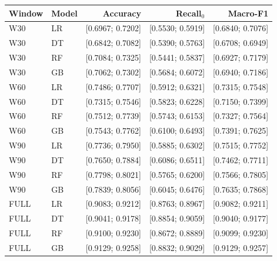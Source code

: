 \small
\setlength{\tabcolsep}{4pt}
\begin{tabular}{@{}llrrr@{}}
\toprule
Window & Model & Accuracy & Recall$_0$ & Macro-F1 \\
\midrule
W30 & LR & [0.6967; 0.7202] & [0.5530; 0.5919] & [0.6840; 0.7076] \\
W30 & DT & [0.6842; 0.7082] & [0.5390; 0.5763] & [0.6708; 0.6949] \\
W30 & RF & [0.7084; 0.7325] & [0.5441; 0.5837] & [0.6927; 0.7179] \\
W30 & GB & [0.7062; 0.7302] & [0.5684; 0.6072] & [0.6940; 0.7186] \\
W60 & LR & [0.7486; 0.7707] & [0.5912; 0.6321] & [0.7315; 0.7548] \\
W60 & DT & [0.7315; 0.7546] & [0.5823; 0.6228] & [0.7150; 0.7399] \\
W60 & RF & [0.7512; 0.7739] & [0.5743; 0.6153] & [0.7327; 0.7564] \\
W60 & GB & [0.7543; 0.7762] & [0.6100; 0.6493] & [0.7391; 0.7625] \\
W90 & LR & [0.7736; 0.7950] & [0.5885; 0.6302] & [0.7515; 0.7752] \\
W90 & DT & [0.7650; 0.7884] & [0.6086; 0.6511] & [0.7462; 0.7711] \\
W90 & RF & [0.7798; 0.8021] & [0.5765; 0.6200] & [0.7566; 0.7805] \\
W90 & GB & [0.7839; 0.8056] & [0.6045; 0.6476] & [0.7635; 0.7868] \\
FULL & LR & [0.9083; 0.9212] & [0.8763; 0.8967] & [0.9082; 0.9211] \\
FULL & DT & [0.9041; 0.9178] & [0.8854; 0.9059] & [0.9040; 0.9177] \\
FULL & RF & [0.9100; 0.9230] & [0.8672; 0.8889] & [0.9099; 0.9230] \\
FULL & GB & [0.9129; 0.9258] & [0.8832; 0.9029] & [0.9129; 0.9257] \\
\bottomrule
\end{tabular}
